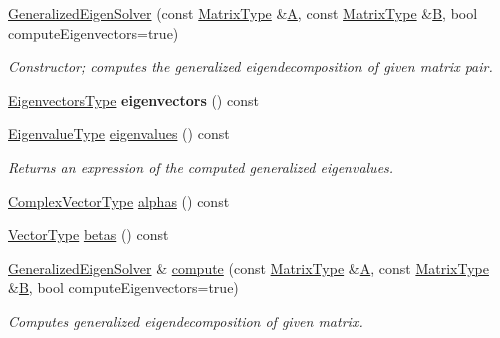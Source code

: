 \begin{DoxyCompactItemize}
\hyperlink{group___eigenvalues___module_a2a3528cbf75f66d3a60af9dc7b12ff65}{Generalized\+Eigen\+Solver} (const \hyperlink{group___eigenvalues___module_a56f4b9823bb9a267de3aaf48428cd247}{Matrix\+Type} \&\hyperlink{group___core___module_class_eigen_1_1_matrix}{A}, const \hyperlink{group___eigenvalues___module_a56f4b9823bb9a267de3aaf48428cd247}{Matrix\+Type} \&\hyperlink{group___core___module_class_eigen_1_1_matrix}{B}, bool compute\+Eigenvectors=true)
\begin{DoxyCompactList}\small\item\em Constructor; computes the generalized eigendecomposition of given matrix pair. \end{DoxyCompactList}\item 
\mbox{\label{group___eigenvalues___module_a33a89a59e7e49f0752c55f6c6cb65754}} 
\hyperlink{group___eigenvalues___module_afffec018dbb2d87b4c09b6acecbb79cd}{Eigenvectors\+Type} {\bfseries eigenvectors} () const
\item 
\hyperlink{group___eigenvalues___module_ad59af178acc401f1bc4e330ef80f286d}{Eigenvalue\+Type} \hyperlink{group___eigenvalues___module_a62f01cd78271efd5e39bcb24e0fe1a58}{eigenvalues} () const
\begin{DoxyCompactList}\small\item\em Returns an expression of the computed generalized eigenvalues. \end{DoxyCompactList}\item 
\hyperlink{group___eigenvalues___module_acfd144329aca76882069da2fc5d53ef5}{Complex\+Vector\+Type} \hyperlink{group___eigenvalues___module_a82b1bc41267f46e5c5899d5b084a73bb}{alphas} () const
\item 
\hyperlink{group___eigenvalues___module_a5aa3d1390c2b0d455c1c9b8b3101b119}{Vector\+Type} \hyperlink{group___eigenvalues___module_abeaa6f56cee367b83fd09d428462ca0c}{betas} () const
\item 
\hyperlink{group___eigenvalues___module_class_eigen_1_1_generalized_eigen_solver}{Generalized\+Eigen\+Solver} \& \hyperlink{group___eigenvalues___module_a044722b70492ff46a2db8b6d5f4620af}{compute} (const \hyperlink{group___eigenvalues___module_a56f4b9823bb9a267de3aaf48428cd247}{Matrix\+Type} \&\hyperlink{group___core___module_class_eigen_1_1_matrix}{A}, const \hyperlink{group___eigenvalues___module_a56f4b9823bb9a267de3aaf48428cd247}{Matrix\+Type} \&\hyperlink{group___core___module_class_eigen_1_1_matrix}{B}, bool compute\+Eigenvectors=true)
\begin{DoxyCompactList}\small\item\em Computes generalized eigendecomposition of given matrix. \end{DoxyCompactList}\item 

\end{DoxyCompactItemize}
